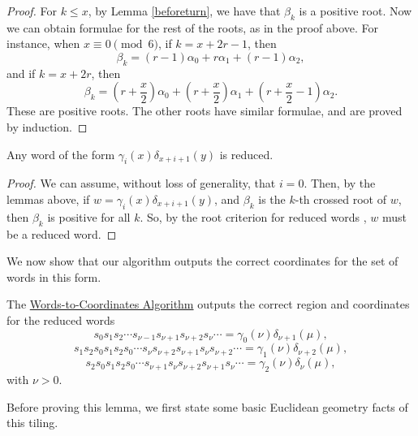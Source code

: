 \documentclass[11pt]{article}
\begin{document}
\begin{proof}
    For $k\leq x$, by Lemma \ref{beforeturn}, we have that $\beta_k$ is a positive root. Now we can obtain formulae for the rest of the roots, as in the proof above. For instance, when $x\equiv 0\pmod 6$, if $k=x+2r-1$, then
\[
\beta_{k}
=
(r-1)\alpha_0+r\alpha_1+(r-1)\alpha_2,
\]
and if $k=x+2r$, then
\[
\beta_{k}
=
(r+\dfrac{x}{2})\alpha_0+(r+\dfrac{x}{2})\alpha_1+(r+\dfrac{x}{2}-1)\alpha_2.
\]
These are positive roots. The other roots have similar formulae, and are proved by induction. 
\end{proof}




\begin{corollary}
    Any word of the form $\gamma_i(x)\delta_{x+i+1}(y)$ is reduced. 
\end{corollary}

\begin{proof}
    We can assume, without loss of generality, that $i=0$. Then, by the lemmas above, if $w=\gamma_i(x)\delta_{x+i+1}(y)$, and $\beta_k$ is the $k$-th crossed root of $w$, then $\beta_k$ is positive for all $k$. So, by the root criterion for reduced words \cite[Chapter 5.4]{HUMPHREYS2}, $w$ must be a reduced word. 
\end{proof}

We now show that our algorithm outputs the correct coordinates for the set of words in this form. 

\begin{proposition}
    
\label{correctcoords}
    The \hyperref[algorithm]{Words-to-Coordinates Algorithm} outputs the correct region and coordinates for the reduced words 
    \[s_0s_1s_2\cdots s_{\nu-1}s_{\nu+1}s_{\nu+2}s_{\nu}\cdots=\gamma_0(\nu)\delta_{\nu+1}(\mu),\]
    \[s_1s_2s_0s_1s_2s_0\cdots s_{\nu}s_{\nu+2}s_{\nu+1}s_{\nu}s_{\nu+2}\cdots=\gamma_1(\nu)\delta_{\nu+2}(\mu),\]
    \[s_2s_0s_1s_2s_0\cdots s_{\nu+1}s_{\nu}s_{\nu+2}s_{\nu+1}s_{\nu}\cdots=\gamma_2(\nu)\delta_{\nu}(\mu),\]
    with $\nu>0$. 
\end{proposition} 

Before proving this lemma, we first state some basic Euclidean geometry facts of this tiling. 
\end{document}
